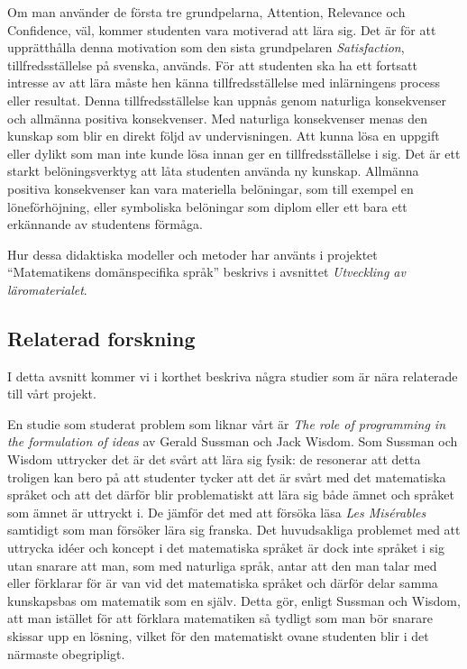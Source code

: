 \documentclass[]{article}
\begin{document}
Om man använder de första tre grundpelarna, Attention, Relevance och
Confidence, väl, kommer studenten vara motiverad att lära sig. Det är
för att upprätthålla denna motivation som den sista grundpelaren
\textit{Satisfaction}, tillfredsställelse på svenska, används. För
att studenten ska ha ett fortsatt intresse av att lära måste hen känna
tillfredsställelse med inlärningens process eller resultat. Denna
tillfredsställelse kan uppnås genom naturliga konsekvenser och
allmänna positiva konsekvenser. Med naturliga konsekvenser menas den
kunskap som blir en direkt följd av undervisningen. Att kunna lösa en
uppgift eller dylikt som man inte kunde lösa innan ger en
tillfredsställelse i sig. Det är ett starkt belöningsverktyg att låta
studenten använda ny kunskap. Allmänna positiva konsekvenser kan vara
materiella belöningar, som till exempel en löneförhöjning, eller
symboliska belöningar som diplom eller ett bara ett erkännande av
studentens förmåga.

Hur dessa didaktiska modeller och metoder har använts i projektet
``Matematikens domänspecifika språk'' beskrivs i avsnittet
\textit{Utveckling av läromaterialet}.

\subsection{Relaterad forskning}
I detta avsnitt kommer vi i korthet beskriva några studier som
är nära relaterade till vårt projekt.

En studie som studerat problem som liknar vårt är \textit{The role of
programming in the formulation of ideas} \cite{sussman2002role} av 
Gerald Sussman och Jack Wisdom.
Som Sussman och Wisdom uttrycker det är det svårt att lära sig fysik:
de resonerar att detta troligen kan bero på
att studenter tycker att det är svårt med det matematiska språket och
att det därför blir problematiskt att lära sig både ämnet och språket
som ämnet är uttryckt i. De jämför det med att försöka läsa
\textit{Les Misérables} samtidigt som man försöker lära sig
franska. Det huvudsakliga problemet med att uttrycka idéer och koncept
i det matematiska språket är dock inte språket i sig utan snarare att
man, som med naturliga språk, antar att den man talar med eller
förklarar för är van vid det matematiska språket och därför delar
samma kunskapsbas om matematik som en själv. Detta gör, enligt Sussman
och Wisdom, att man istället för att förklara
matematiken så tydligt som man bör snarare skissar upp en lösning,
vilket för den matematiskt ovane studenten blir i det närmaste
obegripligt.
\end{document}
